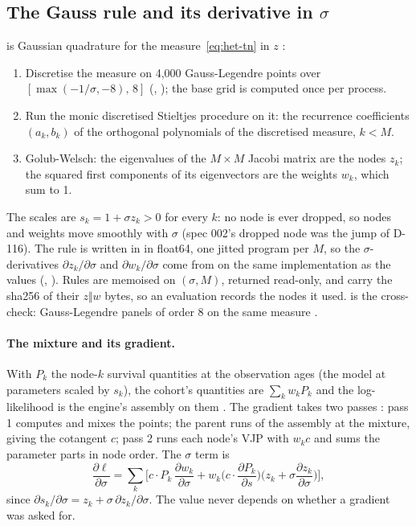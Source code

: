 \subsection{The Gauss rule and its derivative in $\sigma$}\label{sec:het-rule}

 is Gaussian quadrature for the measure~\eqref{eq:het-tn} in $z$
:
\begin{enumerate}[nosep]
  \item Discretise the measure on 4,000 Gauss-Legendre points over $[\max(-1/\sigma,-8),\,8]$ (,
    ); the base grid is computed once per process.
  \item Run the monic discretised Stieltjes procedure on it: the recurrence coefficients $(a_k,b_k)$ of the orthogonal
    polynomials of the discretised measure, $k<M$.
  \item Golub-Welsch: the eigenvalues of the $M\times M$ Jacobi matrix are the nodes $z_k$; the squared first
    components of its eigenvectors are the weights $w_k$, which sum to 1.
\end{enumerate}
The scales are $s_k=1+\sigma z_k>0$ for every $k$: no node is ever dropped, so nodes and weights move smoothly with
$\sigma$ (spec 002's dropped node was the jump of D-116). The rule is written in  in float64, one
jitted program per $M$, so the $\sigma$-derivatives $\partial z_k/\partial\sigma$ and $\partial w_k/\partial\sigma$
come from  on the same implementation as the values (, ). Rules are memoised on
$(\sigma,M)$, returned read-only, and carry the sha256 of their $z\Vert w$ bytes, so an evaluation records the nodes it
used.  is the cross-check: Gauss-Legendre panels of order 8 on the same
measure .

\paragraph{The mixture and its gradient.} With $P_k$ the node-$k$ survival quantities at the observation ages (the
model at parameters scaled by $s_k$), the cohort's quantities are $\sum_k w_kP_k$ and the log-likelihood is the
engine's assembly on them . The gradient takes two passes
: pass 1 computes and mixes the points; the parent runs  of the assembly at
the mixture, giving the cotangent $c$; pass 2 runs each node's VJP with $w_kc$ and sums the parameter parts in node
order. The $\sigma$ term is
\begin{equation}\label{eq:het-dsd}
  \frac{\partial\ell}{\partial\sigma}=\sum_k\Big[c\cdot P_k\,\frac{\partial w_k}{\partial\sigma}
  +w_k\Big(c\cdot\frac{\partial P_k}{\partial s}\Big)\Big(z_k+\sigma\frac{\partial z_k}{\partial\sigma}\Big)\Big],
\end{equation}
since $\partial s_k/\partial\sigma=z_k+\sigma\,\partial z_k/\partial\sigma$. The value never depends on whether a
gradient was asked for.

